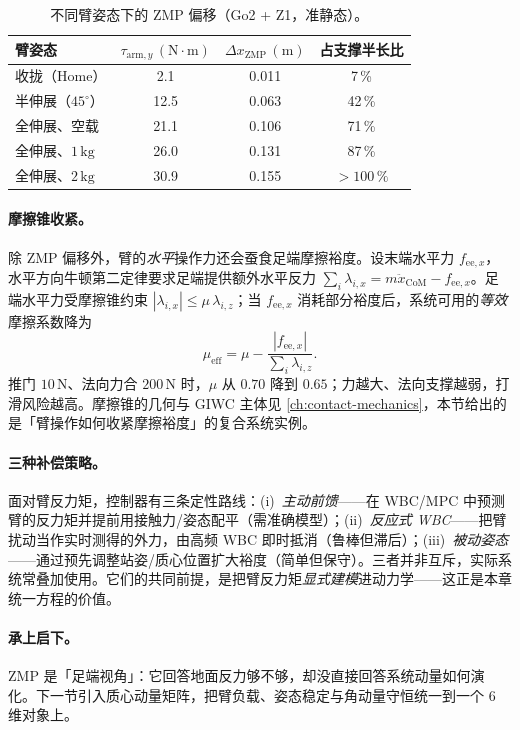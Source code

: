 \begin{table}[H]\centering\small
\caption{不同臂姿态下的 ZMP 偏移（Go2 + Z1，准静态）。}
\label{tab:umm-zmp}
\begin{tabular}{lccc}
\toprule
臂姿态 & $\tau_{\text{arm},y}\,(\mathrm{N\!\cdot\!m})$ & $\Delta x_{\text{ZMP}}\,(\mathrm m)$ & 占支撑半长比 \\
\midrule
收拢（Home） & 2.1 & 0.011 & 7\,\% \\
半伸展（$45^\circ$） & 12.5 & 0.063 & 42\,\% \\
全伸展、空载 & 21.1 & 0.106 & 71\,\% \\
全伸展、$1\,\mathrm{kg}$ & 26.0 & 0.131 & 87\,\% \\
全伸展、$2\,\mathrm{kg}$ & 30.9 & 0.155 & $>100\,\%$ \\
\bottomrule
\end{tabular}
\end{table}

\paragraph{摩擦锥收紧。}
除 ZMP 偏移外，臂的\emph{水平}操作力还会蚕食足端摩擦裕度。设末端水平力 $f_{\text{ee},x}$，水平方向牛顿第二定律要求足端提供额外水平反力 $\sum_i\lambda_{i,x}=m\ddot x_{\text{CoM}}-f_{\text{ee},x}$。足端水平力受摩擦锥约束 $|\lambda_{i,x}|\le\mu\,\lambda_{i,z}$；当 $f_{\text{ee},x}$ 消耗部分裕度后，系统可用的\emph{等效}摩擦系数降为
\begin{equation}
  \mu_{\text{eff}}=\mu-\frac{|f_{\text{ee},x}|}{\sum_i\lambda_{i,z}}.
  \label{eq:umm-mueff}
\end{equation}
推门 $10\,\mathrm N$、法向力合 $200\,\mathrm N$ 时，$\mu$ 从 $0.70$ 降到 $0.65$；力越大、法向支撑越弱，打滑风险越高。摩擦锥的几何与 GIWC 主体见 \cref{ch:contact-mechanics}，本节给出的是「臂操作如何收紧摩擦裕度」的复合系统实例。

\paragraph{三种补偿策略。}
面对臂反力矩，控制器有三条定性路线：(i)~\emph{主动前馈}——在 WBC/MPC 中预测臂的反力矩并提前用接触力/姿态配平（需准确模型）；(ii)~\emph{反应式 WBC}——把臂扰动当作实时测得的外力，由高频 WBC 即时抵消（鲁棒但滞后）；(iii)~\emph{被动姿态}——通过预先调整站姿/质心位置扩大裕度（简单但保守）。三者并非互斥，实际系统常叠加使用。它们的共同前提，是把臂反力矩\emph{显式建模}进动力学——这正是本章统一方程的价值。

\paragraph{承上启下。}
ZMP 是「足端视角」：它回答地面反力够不够，却没直接回答系统动量如何演化。下一节引入质心动量矩阵，把臂负载、姿态稳定与角动量守恒统一到一个 $6$ 维对象上。

